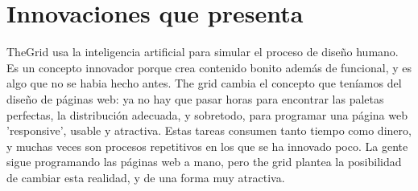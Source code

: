 \section{Innovaciones que presenta}
TheGrid usa la inteligencia artificial para simular el proceso de diseño humano. Es un concepto innovador porque crea contenido bonito además de funcional, y es algo que no se habia hecho antes. The grid cambia el concepto que teníamos del diseño de páginas web: ya no hay que pasar horas para encontrar las paletas perfectas, la distribución adecuada, y sobretodo, para programar una página web 'responsive', usable y atractiva. Estas tareas consumen tanto tiempo como dinero, y muchas veces son procesos repetitivos en los que se ha innovado poco. La gente sigue programando las páginas web a mano, pero the grid plantea la posibilidad de cambiar esta realidad, y de una forma muy atractiva.
